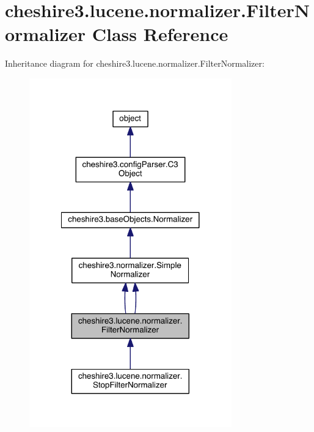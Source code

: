 \hypertarget{classcheshire3_1_1lucene_1_1normalizer_1_1_filter_normalizer}{\section{cheshire3.\-lucene.\-normalizer.\-Filter\-Normalizer Class Reference}
\label{classcheshire3_1_1lucene_1_1normalizer_1_1_filter_normalizer}
}


Inheritance diagram for cheshire3.\-lucene.\-normalizer.\-Filter\-Normalizer\-:
\nopagebreak
\begin{figure}[H]
\begin{center}
\leavevmode
\includegraphics[width=248pt]{classcheshire3_1_1lucene_1_1normalizer_1_1_filter_normalizer__inherit__graph}
\end{center}
\end{figure}


